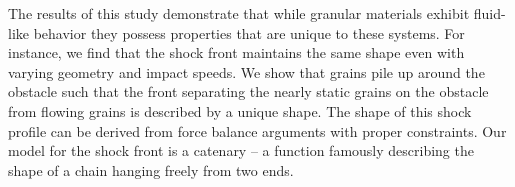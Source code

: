 The results of this study demonstrate that while granular materials exhibit fluid-like behavior they possess properties that are unique to these systems. For instance, we find that the shock front maintains the same shape even with varying geometry and impact speeds. We show that grains pile up around the obstacle such that the front separating the nearly static grains on the obstacle from flowing grains is described by a unique shape. The shape of this shock profile can be derived from force balance arguments with proper constraints. Our model for the shock front is a catenary – a function famously describing the shape of a chain hanging freely from two ends.